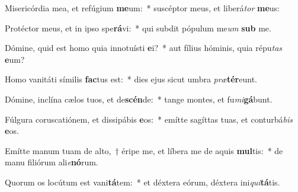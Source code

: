 \item Misericórdia mea, et refúgium \textbf{me}um:~* suscéptor meus, et liberá\textit{tor} \textbf{me}us:
\item Protéctor meus, et in ipso spe\textbf{rá}vi:~* qui subdit pópulum me\textit{um} \textbf{sub} me.
\item Dómine, quid est homo quia innotuísti \textbf{e}i?~* aut fílius hóminis, quia répu\textit{tas} \textbf{e}um?
\item Homo vanitáti símilis \textbf{fac}tus est:~* dies ejus sicut umbra \textit{præ}\textbf{tér}eunt.
\item Dómine, inclína cælos tuos, et de\textbf{scén}de:~* tange montes, et fu\textit{mi}\textbf{gá}bunt.
\item Fúlgura coruscatiónem, et dissipábis \textbf{e}os:~* emítte sagíttas tuas, et conturbá\textit{bis} \textbf{e}os.
\item Emítte manum tuam de alto,~† éripe me, et líbera me de aquis \textbf{mul}tis:~* de manu filiórum ali\textit{e}\textbf{nó}rum.
\item Quorum os locútum est vani\textbf{tá}tem:~* et déxtera eórum, déxtera ini\textit{qui}\textbf{tá}tis.
